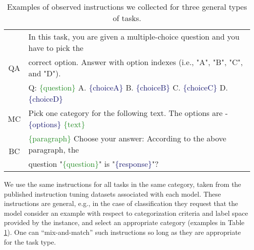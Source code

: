 \begin{table}[h]
  \small
  \centering
  \begin{tabular}{c l}
    \toprule
    \multirow{3}{*}{\textsc{QA}} & In this task, you are given a multiple-choice question and you have to pick the                                                                                                                              \\
                                 & correct option. Answer with option indexes (i.e., "A", "B", "C", and "D").                                                                                                                                   \\
                                 & Q: \textcolor{ForestGreen}{\{question\}} A. \textcolor{MidnightBlue}{\{choiceA\}} B. \textcolor{MidnightBlue}{\{choiceB\}} C. \textcolor{MidnightBlue}{\{choiceC\}} D. \textcolor{MidnightBlue}{\{choiceD\}} \\
    \midrule
    \multirow{1}{*}{\textsc{MC}} & Pick one category for the following text. The options are - \textcolor{MidnightBlue}{\{options\}} \textcolor{ForestGreen}{\{text\}}                                                                          %
    \\
    \midrule
    \multirow{2}{*}{\textsc{BC}} & \textcolor{ForestGreen}{\{paragraph\}} Choose your answer: According to the above paragraph, the                                                                                                             \\
                                 & question "\textcolor{ForestGreen}{\{question\}}" is "\textcolor{MidnightBlue}{\{response\}}"?                                                                                                                \\
    \bottomrule
  \end{tabular}
  \caption{Examples of observed instructions we collected for three general types of tasks.}
  \label{table:instruction-examples}
\end{table}

We use the same instructions for all tasks in the same category, taken from the published instruction tuning datasets associated with each model.
These instructions are general, e.g., in the case of classification they request that the model consider an example with respect to categorization criteria and label space provided by the instance, and select an appropriate category (examples in Table \ref{table:instruction-examples}).
One can ``mix-and-match'' such instructions so long as they are appropriate for the task type.


